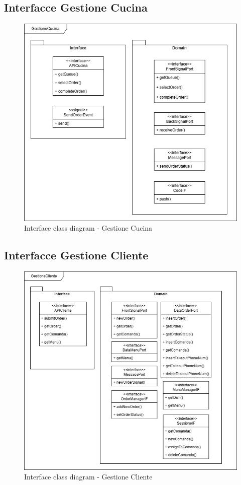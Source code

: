 \subsection{Interfacce Gestione Cucina}
\begin{figure}[H]
	\centering
	\includegraphics[scale=0.5]{iterazione1/images/GestioneCucina interface UML.jpg}
	\caption{Interface class diagram - Gestione Cucina\label{fig:interface_class_diagram_gestione_cucina}}
\end{figure}

\subsection{Interfacce Gestione Cliente}
\begin{figure}[H]
	\centering
	\includegraphics[scale=0.5]{iterazione1/images/GestioneCliente interface UML.jpg}
	\caption{Interface class diagram - Gestione Cliente\label{fig:interface_class_diagram_gestione_cliente}}
\end{figure}

\clearpage